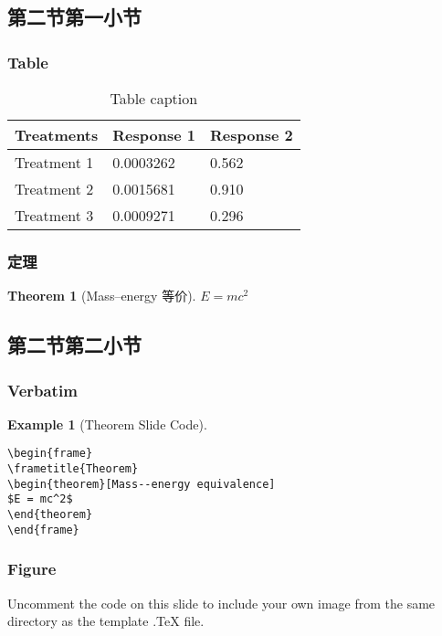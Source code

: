 \documentclass{beamer}
\newtheorem{thm}{Theorem}
\numberwithin{thm}{section}
\numberwithin{defn}{section}
\numberwithin{lmm}{section}
\theoremstyle{example}
\newtheorem{exam}{Example}
\numberwithin{figure}{section}
\numberwithin{table}{section}
\numberwithin{equation}{section}
\begin{document}
\subsection{第二节第一小节}
\begin{frame}
\frametitle{Table}
\begin{table}
\caption{Table caption}
\begin{tabular}{l l l}
\toprule
\textbf{Treatments} & \textbf{Response 1} & \textbf{Response 2}\\
\midrule
Treatment 1 & 0.0003262 & 0.562 \\
Treatment 2 & 0.0015681 & 0.910 \\
Treatment 3 & 0.0009271 & 0.296 \\
\bottomrule
\end{tabular}
\end{table}
\end{frame}


\begin{frame}
\frametitle{定理}
\begin{thm}[Mass--energy 等价]
$E = mc^2$
\end{thm}
\end{frame}
\subsection{第二节第二小节}

\begin{frame}[fragile] %
\frametitle{Verbatim}
\begin{exam}[Theorem Slide Code]
\begin{verbatim}
\begin{frame}
\frametitle{Theorem}
\begin{theorem}[Mass--energy equivalence]
$E = mc^2$
\end{theorem}
\end{frame}\end{verbatim}
\end{exam}
\end{frame}





\begin{frame}
\frametitle{Figure}

Uncomment the code on this slide to include your own image from the same directory as the template .TeX file.
\end{frame}
\end{document}
